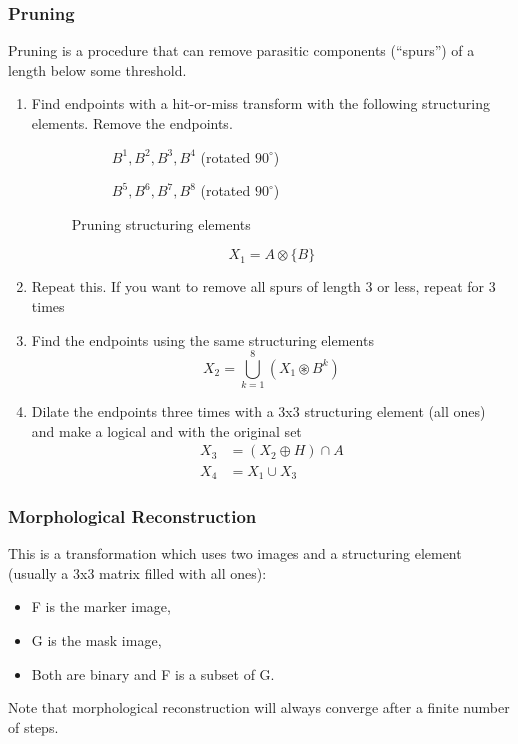 \subsubsection{Pruning}

Pruning is a procedure that can remove parasitic components (``spurs'') of a length below some threshold.
\begin{enumerate}
	\item Find endpoints with a hit-or-miss transform with the following structuring elements. Remove the endpoints.
	\begin{figure}[h!]
		\centering
		\begin{subfigure}[b]{0.45\textwidth}
			\centering
			\caption{$B^1, B^2, B^3, B^4$ (rotated $90^\circ$)}
		\end{subfigure}
		\begin{subfigure}[b]{0.45\textwidth}
			\centering
			\caption{$B^5, B^6, B^7, B^8$ (rotated $90^\circ$)}
		\end{subfigure}
		\caption{Pruning structuring elements}
	\end{figure}
	\[
		X_1 = A \otimes \{B\}
	\]
	\item Repeat this. If you want to remove all spurs of length 3 or less, repeat for 3 times
	\item Find the endpoints using the same structuring elements
  \[
    X_2 = \bigcup_{k=1}^{8}(X_1 \circledast B^{k})
  \]
	\item Dilate the endpoints three times with a 3x3 structuring element (all ones) and make a logical and with the original set
	\begin{align*}
		X_3 &= (X_2 \oplus H) \cap A \\
		X_4 &= X_1 \cup X_3
	\end{align*}
\end{enumerate}

\subsubsection{Morphological Reconstruction}

This is a transformation which uses two images and a structuring element (usually a 3x3 matrix filled with all ones):
\begin{itemize}
	\item F is the marker image,
	\item G is the mask image,
	\item Both are binary and F is a subset of G.
\end{itemize}
Note that morphological reconstruction will always converge after a finite number of steps.

